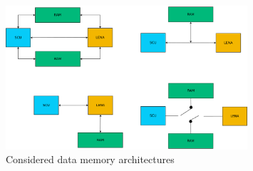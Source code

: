 \begin{figure}[h]
  \centering
  \includegraphics[width=0.8\textwidth]{fig/disc/memarch.pdf}
  \caption[Data Memory Architecturres]{Considered data memory architectures}
  \label{fig:memarch}
\end{figure}
